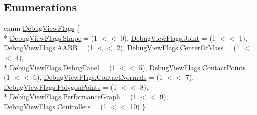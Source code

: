 \subsection*{Enumerations}
\begin{DoxyCompactItemize}
\item 
enum \hyperlink{namespace_farseer_physics_a49e4405bbcaeebabbc6951e026b697e2}{Debug\+View\+Flags} \{ \\*
\hyperlink{namespace_farseer_physics_a49e4405bbcaeebabbc6951e026b697e2a880c1273b27d27cfc82004c3a4b205c9}{Debug\+View\+Flags.\+Shape} = (1 $<$$<$ 0), 
\hyperlink{namespace_farseer_physics_a49e4405bbcaeebabbc6951e026b697e2ab14c4e12de0d9e54e7b57d5d9a39cb99}{Debug\+View\+Flags.\+Joint} = (1 $<$$<$ 1), 
\hyperlink{namespace_farseer_physics_a49e4405bbcaeebabbc6951e026b697e2a4276d50f05d2cac4c98c17337ac30c99}{Debug\+View\+Flags.\+A\+A\+B\+B} = (1 $<$$<$ 2), 
\hyperlink{namespace_farseer_physics_a49e4405bbcaeebabbc6951e026b697e2a8ddd3ffdc4a5d36a6359a5e3e9345d40}{Debug\+View\+Flags.\+Center\+Of\+Mass} = (1 $<$$<$ 4), 
\\*
\hyperlink{namespace_farseer_physics_a49e4405bbcaeebabbc6951e026b697e2a929057de8acd21e1779ca5c883da6b73}{Debug\+View\+Flags.\+Debug\+Panel} = (1 $<$$<$ 5), 
\hyperlink{namespace_farseer_physics_a49e4405bbcaeebabbc6951e026b697e2aa5a95a45154fa9633bfe9c1653de6fe2}{Debug\+View\+Flags.\+Contact\+Points} = (1 $<$$<$ 6), 
\hyperlink{namespace_farseer_physics_a49e4405bbcaeebabbc6951e026b697e2a3267f5ff96ea0d5f9f9bcd453e0f1bcb}{Debug\+View\+Flags.\+Contact\+Normals} = (1 $<$$<$ 7), 
\hyperlink{namespace_farseer_physics_a49e4405bbcaeebabbc6951e026b697e2aca7742eaf8072d9392bfa975e6f96a86}{Debug\+View\+Flags.\+Polygon\+Points} = (1 $<$$<$ 8), 
\\*
\hyperlink{namespace_farseer_physics_a49e4405bbcaeebabbc6951e026b697e2a0dfadf3045fa36ee8c4efbc3eb832dbc}{Debug\+View\+Flags.\+Performance\+Graph} = (1 $<$$<$ 9), 
\hyperlink{namespace_farseer_physics_a49e4405bbcaeebabbc6951e026b697e2acbfb14f470701bf93424d757c624369a}{Debug\+View\+Flags.\+Controllers} = (1 $<$$<$ 10)
 \}
\end{DoxyCompactItemize}



